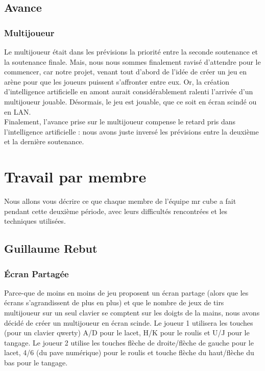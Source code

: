 \documentclass[10pt, titlepage]{report}
\begin{document}
\section{Avance}

\subsection{Multijoueur}
Le multijoueur était dans les prévisions la priorité entre la seconde soutenance et la soutenance finale. Mais, nous nous sommes finalement ravisé d'attendre pour le commencer, car notre projet, venant tout d'abord de l'idée de créer un jeu en arène pour que les joueurs puissent s'affronter entre eux. Or, la création d'intelligence artificielle en amont aurait considérablement ralenti l'arrivée d'un multijoueur jouable. Désormais, le jeu est jouable, que ce soit en écran scindé ou en LAN.\\

Finalement, l'avance prise sur le multijoueur compense le retard pris dans l'intelligence artificielle : nous avons juste inversé les prévisions entre la deuxième et la dernière soutenance.

\chapter{Travail par membre}
Nous allons vous décrire ce que chaque membre de l'équipe mr cube a fait pendant cette deuxième période, avec leurs difficultés rencontrées et les techniques utilisées.

\section{Guillaume Rebut}

\subsection{Écran Partagée} 
 Parce-que de moins en moins de jeu proposent un écran partage (alors que les écrans s'agrandissent de plus en plus) et que le nombre de jeux de tirs multijoueur sur un seul clavier se comptent sur les doigts de la mains, nous avons décidé de créer un multijoueur en écran scinde.
Le joueur 1 utilisera les touches (pour un clavier qwerty) A/D pour le lacet, H/K pour le roulis et U/J pour le tangage. Le joueur 2 utilise les touches flèche de droite/flèche de gauche pour le lacet, 4/6 (du pave numérique) pour le roulis et touche flèche du haut/flèche du bas pour le tangage. \\
\end{document}
